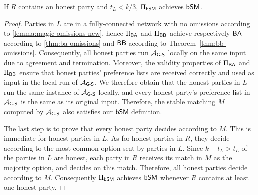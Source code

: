\begin{lemma}\label{lemma:bdsm-protocol:no-omissions}
    If $R$ contains an honest party and $t_L < k/3$, $\Pi_{\textsf{bSM}}$ achieves $\textsf{bSM}$.
\end{lemma}
\begin{proof}
Parties in $L$ are in a fully-connected network with no omissions according to \cref{lemma:magic-omissions-new}, hence $\Pi_{\textsf{BA}}$ and $\Pi_{\textsf{BB}}$ achieve respectively $\textsf{BA}$ according to \cref{thm:ba-omissions} and $\textsf{BB}$ according to Theorem~\ref{thm:bb-omissions}.
Consequently, all honest parties run $\mathcal{A}_\textsf{G-S}$ locally on the same input due to agreement and termination. Moreover, the validity properties of $\Pi_{\textsf{BA}}$ and $\Pi_{\textsf{BB}}$ ensure that honest parties' preference lists are received correctly and used as input in the local run of $\mathcal{A}_\textsf{G-S}$.
We therefore obtain that the honest parties in $L$ run the same instance of $\mathcal{A}_\textsf{G-S}$ locally, and every honest party's preference list in $\mathcal{A}_\textsf{G-S}$ is the same as its original input. Therefore, the stable matching $M$ computed by $\mathcal{A}_\textsf{G-S}$ also satisfies our $\textsf{bSM}$ definition.

The last step is to prove that every honest party decides according to $M$. This is immediate for honest parties in $L$. As for honest parties in $R$, they decide according to the most common option sent by parties in $L$. Since $k - t_L > t_L$ of the parties in $L$ are honest, each party in $R$ receives its match in $M$ as the majority option, and decides on this match.
Therefore, all honest parties decide according to $M$. Consequently $\Pi_{\textsf{bSM}}$ achieves $\textsf{bSM}$ whenever $R$ contains at least one honest party.
\end{proof}



